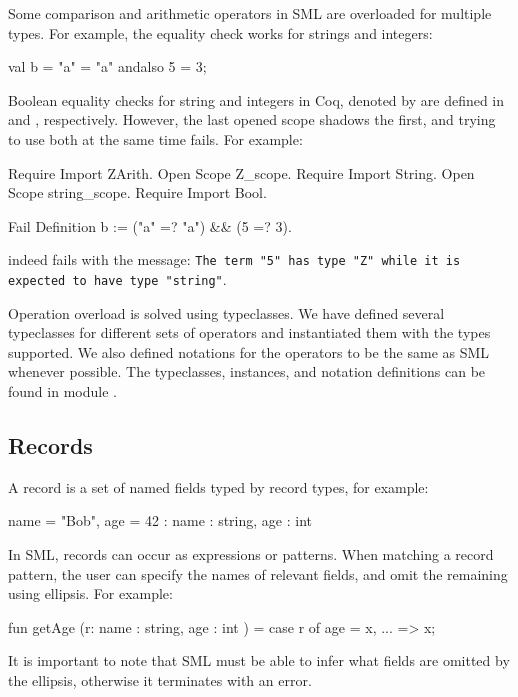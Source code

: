 \documentclass[a4paper,11pt]{article}
\begin{document}
Some comparison and arithmetic operators in SML are overloaded for
multiple types. For example, the equality check works for strings and
integers:

\begin{sml}
val b = "a" = "a" andalso 5 = 3;
\end{sml}

Boolean equality checks for string and integers in Coq, denoted by
 are defined in  and ,
respectively. However, the last opened scope shadows the first, and
trying to use both at the same time fails. For example:

\begin{coq}
Require Import ZArith.
Open Scope Z_scope.
Require Import String.
Open Scope string_scope.
Require Import Bool.

Fail Definition b := ("a" =? "a") && (5 =? 3).
\end{coq}

\noindent
indeed fails with the message:
\texttt{The term "5" has type "Z" while it is expected to have type
"string"}.

Operation overload is solved using typeclasses. We have defined
several typeclasses for different sets of operators and instantiated
them with the types supported. We also defined notations for the
operators to be the same as SML whenever possible. The typeclasses,
instances, and notation definitions can be found in module
.

\subsection{Records}
\label{sec:records}

A record is a set of named fields typed by record types, for example:

\begin{sml}
{name = "Bob", age = 42} : {name : string, age : int }
\end{sml}

In SML, records can occur as expressions or patterns. When matching a
record pattern, the user can specify the names of relevant fields, and
omit the remaining using ellipsis. For example:

\begin{sml}
fun getAge (r: {name : string, age : int }) = case r of
  {age = x, ...} => x;
\end{sml}

It is important to note that SML must be able to infer what fields are
omitted by the ellipsis, otherwise it terminates with an error.
\end{document}
